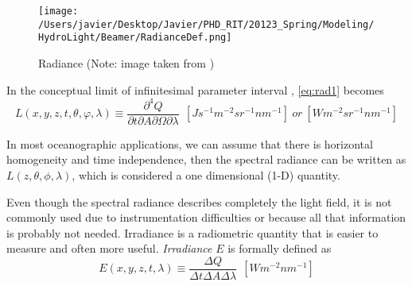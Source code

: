 \begin{figure}[htb]
  \centering
  \texttt{[image: /Users/javier/Desktop/Javier/PHD\_RIT/20123\_Spring/Modeling/HydroLight/Beamer/RadianceDef.png]}
\caption{Radiance (Note: image taken from \citet{Mobley:2001})}
\label{fig:radiance} 
\end{figure}

In the conceptual limit of infinitesimal parameter interval \citep{Mobley:2001}, \autoref{eq:rad1} becomes
\begin{equation}
  L(x,y,z,t,\theta,\varphi,\lambda)\equiv\frac{\partial^4 Q}{\partial t\partial A\partial\Omega\partial\lambda}~~\left[ Js^{-1}m^{-2}sr^{-1}nm^{-1} \right]~or~\left[ W m^{-2}sr^{-1}nm^{-1} \right]
\end{equation}

In most oceanographic applications, we can assume that there is horizontal homogeneity and time independence, then the spectral radiance can be written as $L(z,\theta,\phi,\lambda)$, which is considered a one dimensional (1-D) quantity.

Even though the spectral radiance describes completely the light field, it is not commonly used due to instrumentation difficulties or because all that information is probably not needed. Irradiance is a radiometric quantity that is easier to measure and often more useful. {\it Irradiance} $E$ is formally defined as
\begin{equation}
  E(x,y,z,t,\lambda) \equiv \frac{\Delta Q}{\Delta t\Delta A\Delta\lambda}~~\left[ W m^{-2}nm^{-1} \right]
\end{equation}

